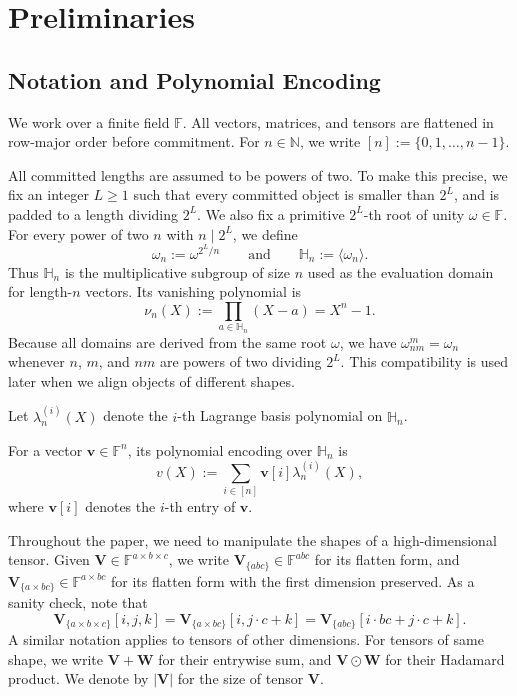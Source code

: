 \section{Preliminaries}

\subsection{Notation and Polynomial Encoding}

We work over a finite field $\mathbb{F}$. All vectors, matrices, and tensors are
flattened in row-major order before commitment. For $n \in \mathbb{N}$, we write
$[n] := \{0,1,\ldots,n-1\}$.

All committed lengths are assumed to be powers of two. To make this precise, we
fix an integer $L \ge 1$ such that every committed object is smaller than $2^L$,
and is padded to a length
dividing $2^L$. We also fix a primitive $2^L$-th root of unity $\omega \in
\mathbb{F}$. For every power of two $n$ with $n \mid 2^L$, we define
\[
\omega_n := \omega^{2^L/n}
\qquad\text{and}\qquad
\mathbb{H}_n := \langle \omega_n \rangle.
\]
Thus $\mathbb{H}_n$ is the multiplicative subgroup of size $n$ used as the
evaluation domain for length-$n$ vectors. Its vanishing polynomial is
\[
\nu_n(X) := \prod_{a \in \mathbb{H}_n}(X-a) = X^n-1.
\]
Because all domains are derived from the same root $\omega$, we have
$\omega_{nm}^m=\omega_n$ whenever $n$, $m$, and $nm$ are powers of two dividing
$2^L$. This compatibility is used later when we align objects of different
shapes.

Let $\lambda_n^{(i)}(X)$ denote the $i$-th Lagrange basis polynomial on
$\mathbb{H}_n$.

For a vector $\mathbf{v}\in\mathbb{F}^n$, its polynomial encoding over
$\mathbb{H}_n$ is
\[
v(X) := \sum_{i \in [n]} \mathbf{v}[i] \lambda_n^{(i)}(X),
\]
where $\mathbf{v}[i]$ denotes the $i$-th entry of $\mathbf{v}$.

Throughout the paper, we need to manipulate the shapes
of a high-dimensional tensor. Given $\mathbf{V}\in \mathbb{F}^{a\times b\times c}$,
we write $\mathbf{V}_{\{abc\}}\in \mathbb{F}^{abc}$ for its flatten form,
and $\mathbf{V}_{\{a\times bc\}}\in \mathbb{F}^{a\times bc}$ for its flatten form with the first dimension preserved.
As a sanity check, note that
\[
\mathbf{V}_{\{a\times b\times c\}}[i, j, k] = \mathbf{V}_{\{a\times bc\}}[i, j \cdot c + k] = \mathbf{V}_{\{abc\}}[i \cdot bc + j \cdot c + k].
\]
A similar notation applies to tensors of other dimensions.
For tensors of same shape, we write $\mathbf{V}+\mathbf{W}$ for their entrywise sum, and
$\mathbf{V}\odot\mathbf{W}$ for their Hadamard product.
We denote by $|\mathbf{V}|$ for the size of tensor $\mathbf{V}$.

